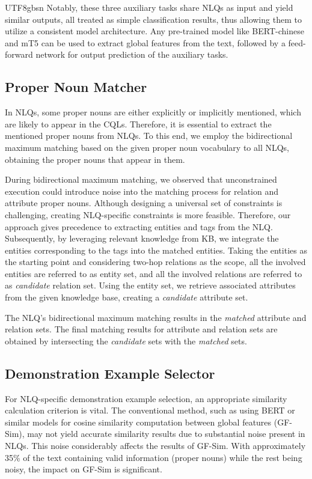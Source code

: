 \documentclass[runningheads]{llncs}
\begin{document}
\begin{CJK*}{UTF8}{gbsn}
Notably, these three auxiliary tasks share NLQs as input and yield similar outputs, all treated as simple classification results, thus allowing them to utilize a consistent model architecture.
Any pre-trained model like BERT-chinese and mT5 can be used to extract global features from the text, followed by a feed-forward network for output prediction of the auxiliary tasks.


\subsection{Proper Noun Matcher}
\label{match_section}

In NLQs, some proper nouns are either explicitly or implicitly mentioned, which are likely to appear in the CQLs. 
Therefore, it is essential to extract the mentioned proper nouns from NLQs. 
To this end, we employ the bidirectional maximum matching based on the given proper noun vocabulary to all NLQs, obtaining the proper nouns that appear in them.

During bidirectional maximum matching, we observed that unconstrained execution could introduce noise into the matching process for relation and attribute proper nouns. 
Although designing a universal set of constraints is challenging, creating NLQ-specific constraints is more feasible.
Therefore, our approach gives precedence to extracting entities and tags from the NLQ. 
Subsequently, by leveraging relevant knowledge from KB, we integrate the entities corresponding to the tags into the matched entities.
Taking the entities as the starting point and considering two-hop relations as the scope, all the involved entities are referred to as entity set, and all the involved relations are referred to as \textit{candidate} relation set.
Using the entity set, we retrieve associated attributes from the given knowledge base, creating a \textit{candidate} attribute set.

The NLQ's bidirectional maximum matching results in the \textit{matched} attribute and relation sets.
The final matching results for attribute and relation sets are obtained by intersecting the \textit{candidate} sets with the \textit{matched} sets.


\subsection{Demonstration Example Selector}
\label{similarity_section}

For NLQ-specific demonstration example selection, an appropriate similarity calculation criterion is vital. 
The conventional method, such as using BERT or similar models for cosine similarity computation between global features (GF-Sim), may not yield accurate similarity results due to substantial noise present in NLQs. This noise considerably affects the results of GF-Sim. 
With approximately 35\% of the text containing valid information (proper nouns) while the rest being noisy, the impact on GF-Sim is significant.


\end{CJK*}
\end{document}
